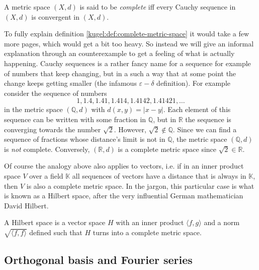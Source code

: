 \begin{definition}
  \label{kugel:def:complete-metric-space}
  A metric space \((X, d)\) is said to be \emph{complete} iff every Cauchy
  sequence in \((X, d)\) is convergent in \((X, d)\).
\end{definition}

To fully explain definition \ref{kugel:def:complete-metric-space} it would
take a few more pages, which would get a bit too heavy. So instead we will
give an informal explanation through an counterexample to get a feeling of
what is actually happening. Cauchy sequences is a rather fancy name for a
sequence for example of numbers that keep changing, but in a such a way that
at some point the change keeps getting smaller (the infamous
\(\varepsilon-\delta\) definition). For example consider the sequence of
numbers
\[
  1,
  1.4,
  1.41,
  1.414,
  1.4142,
  1.41421,
  \ldots
\]
in the metric space \((\mathbb{Q}, d)\) with \(d(x, y) = |x - y|\). Each
element of this sequence can be written with some fraction in \(\mathbb{Q}\),
but in \(\mathbb{R}\) the sequence is converging towards the number
\(\sqrt{2}\). However, \(\sqrt{2} \notin \mathbb{Q}\). Since we can find a
sequence of fractions whose distance's limit is not in \(\mathbb{Q}\), the
metric space \((\mathbb{Q}, d)\) is \emph{not} complete. Conversely,
\((\mathbb{R}, d)\) is a complete metric space since \(\sqrt{2} \in
\mathbb{R}\).

Of course the analogy above also applies to vectors, i.e. if in an inner
product space \(V\) over a field \(\mathbb{K}\) all sequences of vectors have
a distance that is always in \(\mathbb{K}\), then \(V\) is also a complete
metric space. In the jargon, this particular case is what is known as a
Hilbert space, after the very influential German mathematician David Hilbert.

\begin{definition}
  \label{kugel:def:hilbert}
  A Hilbert space is a vector space \(H\) with an inner product \(\langle f, g
  \rangle\) and a norm \(\sqrt{\langle f, f \rangle}\) defined such that \(H\)
  turns into a complete metric space.
\end{definition}

\subsection{Orthogonal basis and Fourier series}
\label{kugel:sec:preliminaries:ortho-fourier}

